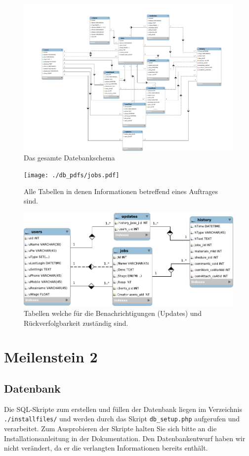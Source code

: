 \documentclass[ngerman, 12pt, pdftex]{scrartcl}[2006/07/30]
\begin{document}
\begin{figure}[p]
	\centering
	\includegraphics[scale=0.4]{./db_pdfs/everything.pdf}
	\caption{Das gesamte Datebankschema}
\end{figure}

\begin{figure}[p]
	\centering
	\texttt{[image: ./db\_pdfs/jobs.pdf]}
	\caption{Alle Tabellen in denen Informationen betreffend eines Auftrages sind.}
\end{figure}

\begin{figure}[hbt]
	\centering
	\includegraphics[scale=0.9]{./db_pdfs/history.pdf}
	\caption{Tabellen welche für die Benachrichtigungen (Updates) und Rückverfolgbarkeit zuständig sind.}
\end{figure}

\newpage
\section{Meilenstein 2}
\subsection{Datenbank}
Die SQL-Skripte zum erstellen und füllen der Datenbank liegen im Verzeichnis \verb+./installfiles/+ und werden durch das Skript \verb+db_setup.php+ aufgerufen und verarbeitet. Zum Ausprobieren der Skripte halten Sie sich bitte an die Installationsanleitung in der Dokumentation.
Den Datenbankentwurf haben wir nicht verändert, da er die verlangten Informationen bereits enthält.
\end{document}
